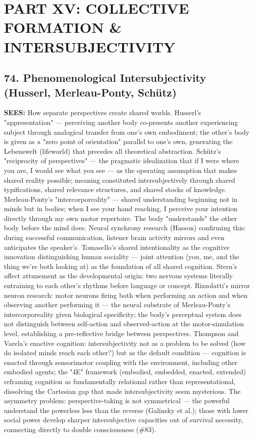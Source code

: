 \section*{PART XV: COLLECTIVE FORMATION \& INTERSUBJECTIVITY}


\subsection*{74. Phenomenological Intersubjectivity (Husserl, Merleau-Ponty, Schütz)}


\textbf{SEES:} How separate perspectives create shared worlds. Husserl's "appresentation" — perceiving another body co-presents another experiencing subject through analogical transfer from one's own embodiment; the other's body is given as a "zero point of orientation" parallel to one's own, generating the Lebenswelt (lifeworld) that precedes all theoretical abstraction. Schütz's "reciprocity of perspectives" — the pragmatic idealization that if I were where you are, I would see what you see — as the operating assumption that makes shared reality possible; meaning constituted intersubjectively through shared typifications, shared relevance structures, and shared stocks of knowledge. Merleau-Ponty's "intercorporeality" — shared understanding beginning not in minds but in bodies; when I see your hand reaching, I perceive your intention directly through my own motor repertoire. The body "understands" the other body before the mind does. Neural synchrony research (Hasson) confirming this: during successful communication, listener brain activity mirrors and even anticipates the speaker's. Tomasello's shared intentionality as the cognitive innovation distinguishing human sociality — joint attention (you, me, and the thing we're both looking at) as the foundation of all shared cognition. Stern's affect attunement as the developmental origin: two nervous systems literally entraining to each other's rhythms before language or concept. Rizzolatti's mirror neuron research: motor neurons firing both when performing an action and when observing another performing it — the neural substrate of Merleau-Ponty's intercorporeality given biological specificity; the body's perceptual system does not distinguish between self-action and observed-action at the motor-simulation level, establishing a pre-reflective bridge between perspectives. Thompson and Varela's enactive cognition: intersubjectivity not as a problem to be solved (how do isolated minds reach each other?) but as the default condition — cognition is enacted through sensorimotor coupling with the environment, including other embodied agents; the "4E" framework (embodied, embedded, enacted, extended) reframing cognition as fundamentally relational rather than representational, dissolving the Cartesian gap that made intersubjectivity seem mysterious. The asymmetry problem: perspective-taking is not symmetrical — the powerful understand the powerless less than the reverse (Galinsky et al.); those with lower social power develop sharper intersubjective capacities out of survival necessity, connecting directly to double consciousness (\#83).


